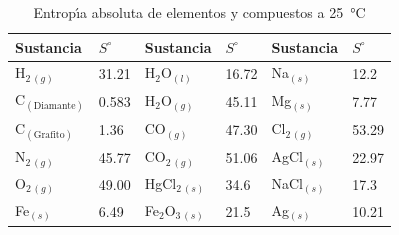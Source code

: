 \begin{table}[htb]
\centering  %
\begin{threeparttable}

    \caption[Entrop\'{\i}a absoluta]{%
        Entrop\'{\i}a absoluta de elementos y compuestos a \SI{25}{\celsius}}
    \label{tab:entropia_absoluta}

    {\small
    \begin{tabular}{ll ll ll}
        \toprule
        \textbf{Sustancia} & \textbf{$S^\circ$} &
        \textbf{Sustancia} & \textbf{$S^\circ$} &
        \textbf{Sustancia} & \textbf{$S^\circ$} \\
        \midrule
        H$_{2\,(g)}$                & 31.21 &
        H$_2$O$_{(l)}$              & 16.72 &
        Na$_{(s)}$                  & 12.2  \\

        C$_{(\mathrm{Diamante})}$   & 0.583 &
        H$_2$O$_{(g)}$              & 45.11 &
        Mg$_{(s)}$                  & 7.77  \\

        C$_{(\mathrm{Grafito})}$    & 1.36  &
        CO$_{(g)}$                  & 47.30 &
        Cl$_{2\,(g)}$               & 53.29 \\

        N$_{2\,(g)}$                & 45.77 &
        CO$_{2\,(g)}$               & 51.06 &
        AgCl$_{(s)}$                & 22.97 \\

        O$_{2\,(g)}$                & 49.00 &
        HgCl$_{2\,(s)}$             & 34.6  &
        NaCl$_{(s)}$                & 17.3  \\

        Fe$_{(s)}$                  & 6.49  &
        Fe$_2$O$_{3\,(s)}$          & 21.5  &
        Ag$_{(s)}$                  & 10.21 \\


\end{tabular}}
\end{threeparttable}
\end{table}
